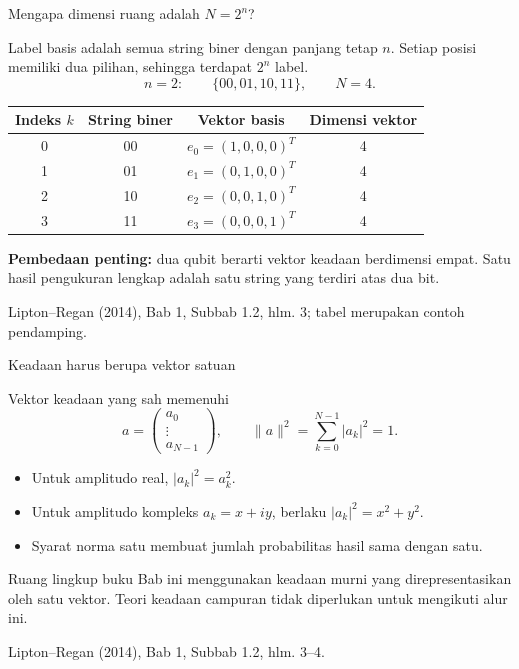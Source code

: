 \documentclass[aspectratio=169,11pt]{beamer}
\newcommand{\bookref}[1]{\par\vfill{\scriptsize\color{gray}Lipton--Regan (2014), Bab 1, #1.}}
\begin{document}
\begin{frame}{Mengapa dimensi ruang adalah $N=2^n$?}

Label basis adalah semua string biner dengan panjang tetap $n$. Setiap posisi memiliki dua pilihan, sehingga terdapat $2^n$ label.
\[
 n=2:\qquad \{00,01,10,11\},\qquad N=4.
\]
\begin{center}
\begin{tabular}{cccc}\toprule
Indeks $k$ & String biner & Vektor basis & Dimensi vektor\\\midrule
0 & 00 & $e_0=(1,0,0,0)^T$ & 4\\
1 & 01 & $e_1=(0,1,0,0)^T$ & 4\\
2 & 10 & $e_2=(0,0,1,0)^T$ & 4\\
3 & 11 & $e_3=(0,0,0,1)^T$ & 4\\\bottomrule
\end{tabular}
\end{center}
\textbf{Pembedaan penting:} dua qubit berarti vektor keadaan berdimensi empat. Satu hasil pengukuran lengkap adalah satu string yang terdiri atas dua bit.
\bookref{Subbab 1.2, hlm. 3; tabel merupakan contoh pendamping}

\end{frame}

\begin{frame}{Keadaan harus berupa vektor satuan}
\setlength{\abovedisplayskip}{5pt}\setlength{\belowdisplayskip}{5pt}

Vektor keadaan yang sah memenuhi
\[
 a=\begin{pmatrix}a_0\\\vdots\\a_{N-1}\end{pmatrix},\qquad
 \|a\|^2=\sum_{k=0}^{N-1}|a_k|^2=1.
\]
\begin{itemize}
\item Untuk amplitudo real, $|a_k|^2=a_k^2$.
\item Untuk amplitudo kompleks $a_k=x+iy$, berlaku $|a_k|^2=x^2+y^2$.
\item Syarat norma satu membuat jumlah probabilitas hasil sama dengan satu.
\end{itemize}
\begin{block}{Ruang lingkup buku}
Bab ini menggunakan keadaan murni yang direpresentasikan oleh satu vektor. Teori keadaan campuran tidak diperlukan untuk mengikuti alur ini.
\end{block}
\vspace{-4pt}
\bookref{Subbab 1.2, hlm. 3--4}

\end{frame}
\end{document}
